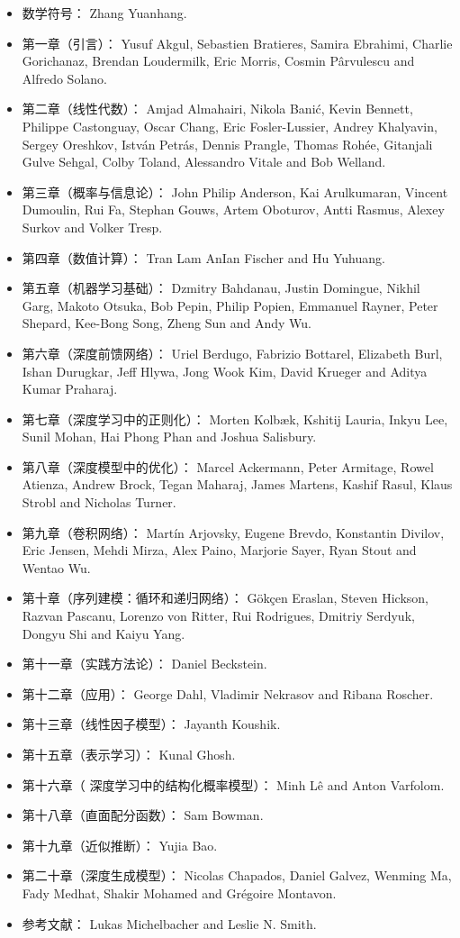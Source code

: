\begin{itemize}
\item 数学符号： Zhang Yuanhang.
\item  第一章（引言）： 
Yusuf Akgul, Sebastien Bratieres, Samira Ebrahimi, Charlie Gorichanaz, Brendan Loudermilk, Eric Morris, Cosmin Pârvulescu and Alfredo Solano.
\item  第二章（线性代数）：
Amjad Almahairi, Nikola Bani\'{c}, Kevin Bennett, Philippe Castonguay, Oscar Chang, Eric Fosler-Lussier, Andrey Khalyavin, Sergey Oreshkov, Istv\'an Petr\'as, Dennis Prangle, Thomas Roh\'ee, Gitanjali Gulve Sehgal, Colby Toland, Alessandro Vitale and Bob Welland.
\item  第三章（概率与信息论）：
John Philip Anderson, Kai Arulkumaran, Vincent Dumoulin, Rui Fa, Stephan Gouws, Artem Oboturov, Antti Rasmus, Alexey Surkov and Volker Tresp.
\item  第四章（数值计算）：
Tran Lam AnIan Fischer and Hu Yuhuang.
\item  第五章（机器学习基础）：
Dzmitry Bahdanau, Justin Domingue, Nikhil Garg, Makoto Otsuka, Bob Pepin, Philip Popien, Emmanuel Rayner, Peter Shepard, Kee-Bong Song, Zheng Sun and Andy Wu.
\item 第六章（深度前馈网络）：
Uriel Berdugo, Fabrizio Bottarel, Elizabeth Burl, Ishan Durugkar, Jeff Hlywa, Jong Wook Kim, David Krueger and Aditya Kumar Praharaj.
\item 第七章（深度学习中的正则化）：
Morten Kolbæk, Kshitij Lauria, Inkyu Lee, Sunil Mohan, Hai Phong Phan and Joshua Salisbury.
\item  第八章（深度模型中的优化）：
Marcel Ackermann, Peter Armitage, Rowel Atienza, Andrew Brock, Tegan Maharaj, James Martens, Kashif Rasul, Klaus Strobl and Nicholas Turner.
\item 第九章（卷积网络）：
Mart\'in Arjovsky, Eugene Brevdo, Konstantin Divilov, Eric Jensen, Mehdi Mirza, Alex Paino, Marjorie Sayer, Ryan Stout and Wentao Wu.
\item 第十章（序列建模：循环和递归网络）：
Gökçen Eraslan, Steven Hickson, Razvan Pascanu, Lorenzo von Ritter, Rui Rodrigues, Dmitriy Serdyuk, Dongyu Shi and Kaiyu Yang.
\item 第十一章（实践方法论）：
Daniel Beckstein.
\item 第十二章（应用）：
George Dahl, Vladimir Nekrasov and Ribana Roscher.
\item 第十三章（线性因子模型）：
Jayanth Koushik.
\item 第十五章（表示学习）：
    Kunal Ghosh.
\item 第十六章（ 深度学习中的结构化概率模型）： 
    Minh Lê and Anton Varfolom.
\item 第十八章（直面配分函数）：
	Sam Bowman.
\item 第十九章（近似推断）：
Yujia Bao.
\item 第二十章（深度生成模型）：
Nicolas Chapados, Daniel Galvez, Wenming Ma, Fady Medhat, Shakir Mohamed and Gr\'egoire Montavon.
\item 参考文献：
Lukas Michelbacher and Leslie N. Smith.
\end{itemize}



